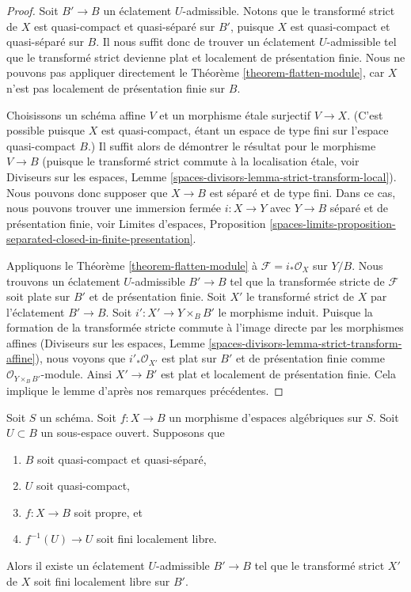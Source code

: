 \begin{proof}
Soit $B' \to B$ un éclatement $U$-admissible. Notons que le transformé strict
de $X$ est quasi-compact et quasi-séparé sur $B'$, puisque $X$ est quasi-compact
et quasi-séparé sur $B$. Il nous suffit donc de trouver
un éclatement $U$-admissible tel que le transformé strict devienne plat et
localement de présentation finie. Nous ne pouvons pas appliquer directement le
Théorème \ref{theorem-flatten-module}, car $X$ n'est pas localement de
présentation finie sur $B$.

\medskip\noindent
Choisissons un schéma affine $V$ et un morphisme étale surjectif $V \to X$.
(C'est possible puisque $X$ est quasi-compact, étant un espace de type fini sur
l'espace quasi-compact $B$.) Il suffit alors de démontrer le résultat pour
le morphisme $V \to B$ (puisque le transformé strict commute à la localisation
étale, voir Diviseurs sur les espaces,
Lemme \ref{spaces-divisors-lemma-strict-transform-local}).
Nous pouvons donc supposer que $X \to B$ est séparé et de type fini.
Dans ce cas, nous pouvons trouver une immersion fermée $i : X \to Y$ avec $Y \to B$
séparé et de présentation finie, voir
Limites d'espaces, Proposition
\ref{spaces-limits-proposition-separated-closed-in-finite-presentation}.

\medskip\noindent
Appliquons le Théorème \ref{theorem-flatten-module} à $\mathcal{F} = i_*\mathcal{O}_X$
sur $Y/B$. Nous trouvons un éclatement $U$-admissible $B' \to B$ tel que la
transformée stricte de $\mathcal{F}$ soit plate sur $B'$ et de présentation finie.
Soit $X'$ le transformé strict de $X$ par l'éclatement $B' \to B$.
Soit $i' : X' \to Y \times_B B'$ le morphisme induit.
Puisque la formation de la transformée stricte commute à l'image directe par les morphismes
affines (Diviseurs sur les espaces, Lemme
\ref{spaces-divisors-lemma-strict-transform-affine}),
nous voyons que $i'_*\mathcal{O}_{X'}$ est plat sur $B'$ et de
présentation finie comme $\mathcal{O}_{Y \times_B B'}$-module.
Ainsi $X' \to B'$ est plat et localement de présentation finie.
Cela implique le lemme d'après nos remarques précédentes.
\end{proof}

\begin{lemma}
\label{lemma-finite-after-blowing-up}
Soit $S$ un schéma. Soit $f : X \to B$ un morphisme d'espaces
algébriques sur $S$. Soit $U \subset B$ un sous-espace ouvert. Supposons que
\begin{enumerate}
\item $B$ soit quasi-compact et quasi-séparé,
\item $U$ soit quasi-compact,
\item $f : X \to B$ soit propre, et
\item $f^{-1}(U) \to U$ soit fini localement libre.
\end{enumerate}
Alors il existe un éclatement $U$-admissible $B' \to B$ tel que
le transformé strict $X'$ de $X$ soit fini localement libre sur $B'$.
\end{lemma}

